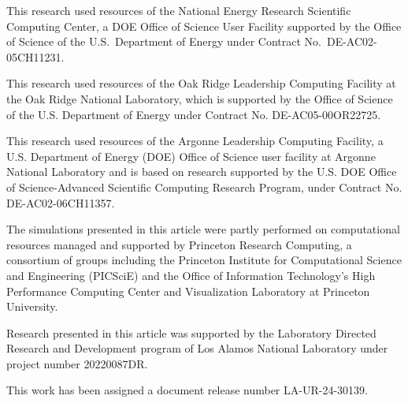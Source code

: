 \documentclass[twocolumn, floatfix]{aastex63}
\begin{document}
This research used resources of the National Energy Research Scientific
Computing Center, a DOE Office of Science User Facility supported by the Office of Science of the U.S.~Department of Energy under Contract No.~DE-AC02-05CH11231.  

This research used resources of the Oak Ridge Leadership Computing Facility at the Oak Ridge National Laboratory, which is supported by the Office of Science of the U.S. Department of Energy under Contract No. DE-AC05-00OR22725.

This research used resources of the Argonne Leadership Computing Facility, a U.S. Department of Energy (DOE) Office of Science user facility at Argonne National Laboratory and is based on research supported by the U.S. DOE Office of Science-Advanced Scientific Computing Research Program, under Contract No. DE-AC02-06CH11357.

The simulations presented in this article were partly performed on computational resources managed and supported by Princeton Research Computing, a consortium of groups including the Princeton Institute for Computational Science and Engineering (PICSciE) and the Office of Information Technology's High Performance Computing Center and Visualization Laboratory at Princeton University. 

Research presented in this article was supported by the Laboratory Directed Research and Development program of Los Alamos National Laboratory under project number 20220087DR.

This work has been assigned a document release number LA-UR-24-30139.

\newpage

{}

\end{document}
